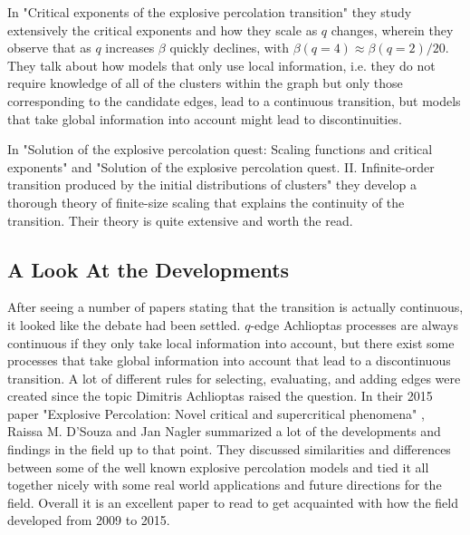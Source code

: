 In "Critical exponents of the explosive percolation transition" \cite{da_Costa_5} they study extensively the critical exponents and how they scale as $q$ changes, wherein they observe that as $q$ increases $\beta$ quickly declines, with $\beta(q = 4) \approx \beta(q = 2) / 20$.
They talk about how models that only use local information, i.e. they do not require knowledge of all of the clusters within the graph but only those corresponding to the candidate edges, lead to a continuous transition, but models that take global information into account might lead to discontinuities.

In "Solution of the explosive percolation quest: Scaling functions and critical exponents" \cite{da_Costa_2}
and "Solution of the explosive percolation quest. II. Infinite-order transition produced by the initial distributions of clusters" \cite{da_Costa_3} they develop a thorough theory of finite-size scaling that explains the continuity of the transition.
Their theory is quite extensive and worth the read.



\subsection{A Look At the Developments}
After seeing a number of papers stating that the transition is actually continuous, it looked like the debate had been settled.
$q$-edge Achlioptas processes are always continuous if they only take local information into account, but there exist some processes that take global information into account that lead to a discontinuous transition.
A lot of different rules for selecting, evaluating, and adding edges were created since the topic Dimitris Achlioptas raised the question.
In their 2015 paper "Explosive Percolation: Novel critical and supercritical phenomena" \cite{D_Souza_2}, Raissa M. D’Souza and Jan Nagler summarized a lot of the developments and findings in the field up to that point.
They discussed similarities and differences between some of the well known explosive percolation models and tied it all together nicely with some real world applications and future directions for the field.
Overall it is an excellent paper to read to get acquainted with how the field developed from 2009 to 2015.
